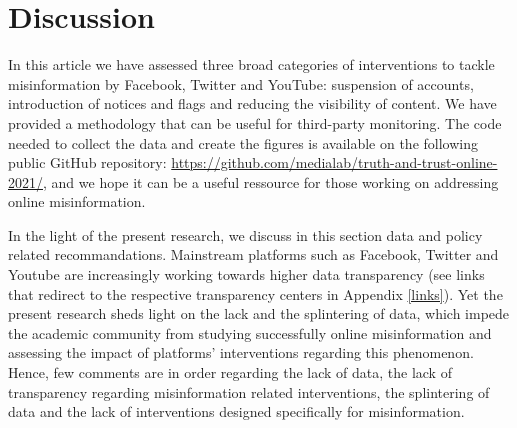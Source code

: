 \documentclass{article}
\begin{document}
\section{Discussion}

In this article we have assessed three broad categories of interventions to tackle misinformation by Facebook, Twitter and YouTube: suspension of accounts, introduction of notices and flags and reducing the visibility of content. We have provided a methodology that can be useful for third-party monitoring. The code needed to collect the data and create the figures is available on the following public GitHub repository: \href{https://github.com/medialab/truth-and-trust-online-2021/}{https://github.com/medialab/truth-and-trust-online-2021/}, and we hope it can be a useful ressource for those working on addressing online misinformation. 


\smallskip


In the light of the present research, we discuss in this section data and policy related recommandations. Mainstream platforms such as Facebook, Twitter and Youtube are increasingly working towards higher data transparency (see links that redirect to the respective transparency centers in Appendix \ref{links}). Yet the present research sheds light on the lack and the splintering of data, which impede the academic community from studying successfully online misinformation and assessing the impact of platforms' interventions regarding this phenomenon. Hence, few comments are in order regarding the lack of data, the lack of transparency regarding misinformation related interventions, the splintering of data and the lack of interventions designed specifically for misinformation. 

\smallskip
\end{document}
